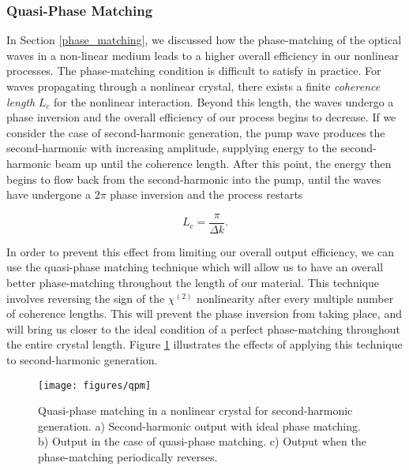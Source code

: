 \subsubsection{Quasi-Phase Matching} 
\label{quasi_phase_matching} 

In Section \ref{phase_matching}, we discussed how the phase-matching of the optical waves in a non-linear medium leads to a higher overall efficiency in our nonlinear processes. The phase-matching condition is difficult to satisfy in practice.  For waves propagating through a nonlinear crystal, there exists a finite \emph{coherence length} $L_c$ for the nonlinear interaction.  Beyond this length, the waves undergo a phase inversion and the overall efficiency of our process begins to decrease.  If we consider the case of second-harmonic generation, the pump wave produces the second-harmonic with increasing amplitude, supplying energy to the second-harmonic beam up until the coherence length.  After this point, the energy then begins to flow back from the second-harmonic into the pump, until the waves have undergone a $2\pi$ phase inversion and the process restarts

\begin{equation}
  \label{eq:coherence_length}
  L_c = \frac{\pi}{\Delta k} .
\end{equation}

In order to prevent this effect from limiting our overall output efficiency, we can use the quasi-phase matching technique which will allow us to have an overall better phase-matching throughout the length of our material.  This technique involves reversing the sign of the $\chi^{(2)}$ nonlinearity after every multiple number of coherence lengths.  This will prevent the phase inversion from taking place, and will bring us closer to the ideal condition of a perfect phase-matching throughout the entire crystal length.  Figure \ref{fig:qpm} illustrates the effects of applying this technique to second-harmonic generation.

\begin{figure}[!ht] 
 \centering 
 \texttt{[image: figures/qpm]} 
 \caption[Quasi-phase matching in a nonlinear crystal]{Quasi-phase matching in a nonlinear crystal for second-harmonic generation.  a) Second-harmonic output with ideal phase matching.  b)  Output in the case of quasi-phase matching.  c) Output when the phase-matching periodically reverses.} 
 \label{fig:qpm} 
\end{figure}



